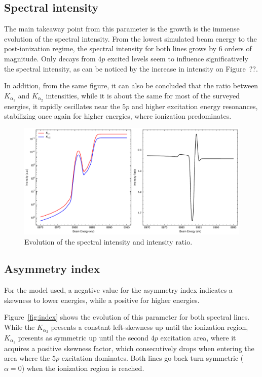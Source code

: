 \subsection{Spectral intensity}

The main takeaway point from this parameter is the growth is the immense evolution of the spectral intensity. From the lowest simulated beam energy to the post-ionization regime, the spectral intensity for both lines grows by 6 orders of magnitude. Only decays from $4p$ excited levels seem to influence significatively the spectral intensity, as can be noticed by the increase in intensity on Figure~??.

In addition, from the same figure, it can also be concluded that the ratio between $K_{\alpha_1}$ and $K_{\alpha_2}$ intensities, while it is about the same for most of the surveyed energies, it rapidly oscillates near the $5p$ and higher excitation energy resonances, stabilizing once again for higher energies, where ionization predominates.

\begin{figure}
    \centering
    \includegraphics[width=\linewidth]{Chapters/Figures/Chapter5/assym_intensities.pdf}
    \caption{Evolution of the spectral intensity and intensity ratio.}\label{fig:intensity}
\end{figure}
\subsection{Asymmetry index}

For the model used, a negative value for the asymmetry index indicates a skewness to lower energies, while a positive for higher energies.

Figure~\ref{fig:index} shows the evolution of this parameter for both spectral lines.
While the $K_{\alpha_2}$ presents a constant left-skewness up until the ionization region, $K_{\alpha_1}$ presents as symmetric up until the second $4p$ excitation area, where it acquires a positive skewness factor, which consecutively drops when entering the area where the $5p$ excitation dominates. Both lines go back turn symmetric ($\alpha=0$) when the ionization region is reached.


